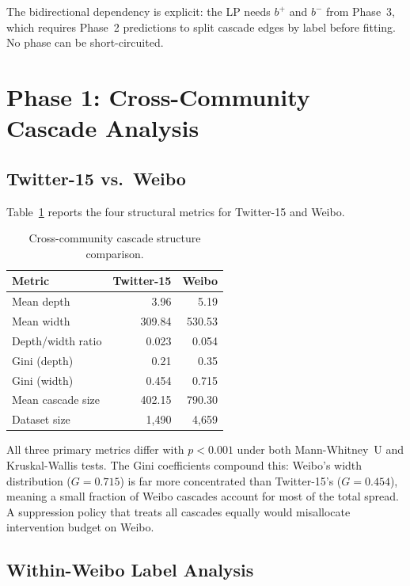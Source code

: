 \documentclass[conference]{IEEEtran}
\begin{document}
The bidirectional dependency is explicit: the LP needs \(b^+\) and \(b^-\)
from Phase~3, which requires Phase~2 predictions to split cascade edges by
label before fitting.
No phase can be short-circuited.

\section{Phase 1: Cross-Community Cascade Analysis}

\subsection{Twitter-15 vs.\ Weibo}

Table~\ref{tab:cross_community} reports the four structural metrics for
Twitter-15 and Weibo.

\begin{table}[h]
\caption{Cross-community cascade structure comparison.}
\label{tab:cross_community}
\centering
\small
\begin{tabular}{lrr}
\toprule
\textbf{Metric} & \textbf{Twitter-15} & \textbf{Weibo} \\
\midrule
Mean depth            & 3.96  & 5.19  \\
Mean width            & 309.84 & 530.53 \\
Depth/width ratio     & 0.023 & 0.054 \\
Gini (depth)          & 0.21  & 0.35  \\
Gini (width)          & 0.454 & 0.715 \\
Mean cascade size     & 402.15 & 790.30 \\
Dataset size          & 1,490 & 4,659 \\
\bottomrule
\end{tabular}
\end{table}

All three primary metrics differ with \(p < 0.001\) under both Mann-Whitney~U
and Kruskal-Wallis tests.
The Gini coefficients compound this: Weibo's width distribution (\(G=0.715\))
is far more concentrated than Twitter-15's (\(G=0.454\)), meaning a small
fraction of Weibo cascades account for most of the total spread.
A suppression policy that treats all cascades equally would misallocate
intervention budget on Weibo.

\subsection{Within-Weibo Label Analysis}
\end{document}
